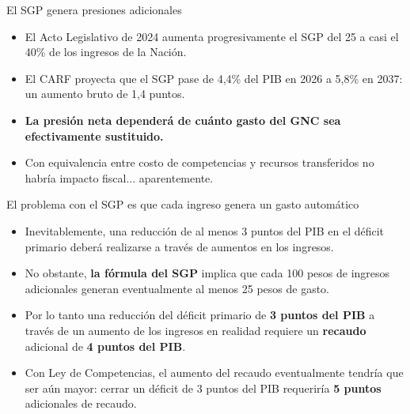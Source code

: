 \begin{frame}{El SGP genera presiones adicionales}
    \begin{itemize}
        \item El Acto Legislativo de 2024  aumenta progresivamente el SGP del 25 a casi el 40\% de los ingresos de la Nación.
        \item El CARF proyecta que el SGP pase de 4,4\% del PIB en 2026 a 5,8\% en 2037: un aumento bruto de 1,4 puntos.
        \item \textbf{La presión neta dependerá de cuánto gasto del GNC sea efectivamente sustituido.}
        \item Con equivalencia entre costo de competencias y recursos transferidos no habría impacto fiscal... aparentemente.
    \end{itemize}

\end{frame}

\begin{frame}{El problema con el SGP es que cada ingreso genera un gasto automático}
    \begin{itemize}
        \item Inevitablemente, una reducción de al menos 3 puntos del PIB en el déficit primario deberá realizarse a través de aumentos en los ingresos.
        \item No obstante, \textbf{la fórmula del SGP} implica que cada 100 pesos de ingresos adicionales generan eventualmente al menos 25 pesos de gasto.
        \item Por lo tanto una reducción del déficit primario de \textbf{3 puntos del PIB} a través de un aumento de los ingresos en realidad requiere un \textbf{recaudo} adicional de  \textbf{4 puntos del PIB}.
        \item Con Ley de Competencias, el aumento del recaudo eventualmente tendría que ser aún mayor: cerrar un déficit de 3 puntos del PIB requeriría \textbf{5 puntos} adicionales de recaudo. 
    \end{itemize}
\end{frame}

